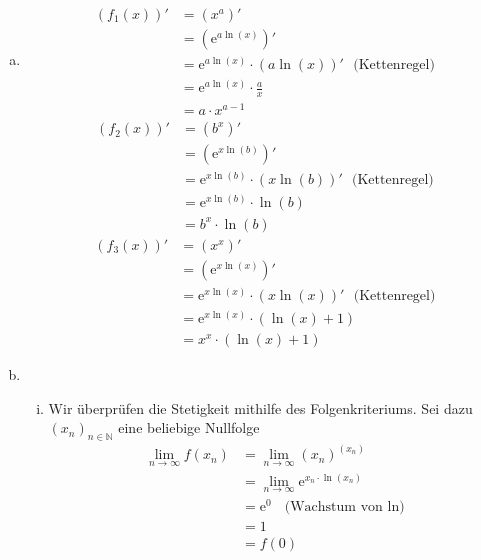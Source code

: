 \documentclass{scrreprt}
\newcommand{\NN}{\mathbb{N}}
\newcommand{\round}[1]{\left(#1\right)}
\newcommand{\euler}{\mathrm{e}}
\begin{document}
\begin{enumerate}[(a)]
\item
    \begin{align*}
        \round{f_1\round{x}}' & = \round{x^a}'\\
        & = \round{\euler^{a \ln\round{x}}}'\\
        & = \euler^{a \ln\round{x}} \cdot \round{a \ln\round{x}}' ~~~ \text{(Kettenregel)}\\
        & = \euler^{a \ln\round{x}} \cdot \frac{a}{x}\\
        & = a \cdot x^{a-1}
    \end{align*}
    \begin{align*}
        \round{f_2\round{x}}' & = \round{b^x}'\\
        & = \round{\euler^{x \ln\round{b}}}'\\
        & = \euler^{x \ln\round{b}} \cdot \round{x \ln\round{b}}' ~~~ \text{(Kettenregel)}\\
        & = \euler^{x \ln\round{b}} \cdot \ln\round{b}\\
        & = b^x \cdot \ln\round{b}
    \end{align*}
    \begin{align*}
        \round{f_3\round{x}}' & = \round{x^x}'\\
        & = \round{\euler^{x \ln\round{x}}}'\\
        & = \euler^{x \ln\round{x}} \cdot \round{x \ln\round{x}}' ~~~ \text{(Kettenregel)}\\
        & = \euler^{x \ln\round{x}} \cdot \round{\ln\round{x} + 1}\\
        & = x^x \cdot \round{\ln\round{x} + 1}
    \end{align*}
\item
    \begin{enumerate}[(i)]
    \item
        Wir überprüfen die Stetigkeit mithilfe des Folgenkriteriums. Sei dazu $(x_n)_{n \in \NN}$ eine beliebige Nullfolge
        \begin{align*}
            \lim\limits_{n \to \infty} f(x_n) & = \lim\limits_{n \to \infty} \round{x_n}^{\round{x_n}}\\
            & = \lim\limits_{n \to \infty} \euler^{x_n \cdot \ln\round{x_n}}\\
            & = \euler^0 ~~~ \text{(Wachstum von $\ln$)}\\
            & = 1\\
            & = f(0)
        \end{align*}

\end{enumerate}
\end{enumerate}
\end{document}
